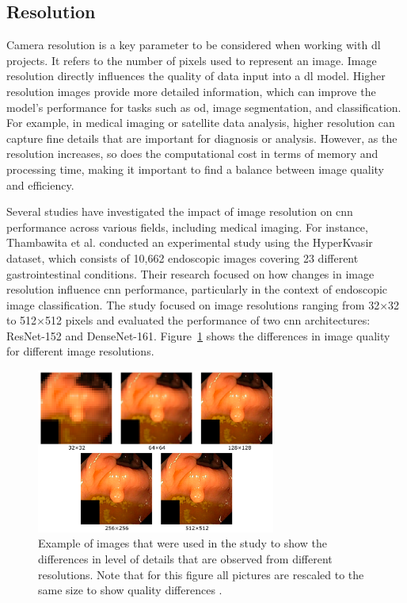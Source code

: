 \subsection{Resolution}
Camera resolution is a key parameter to be considered when working with \gls{dl} projects. It refers to the number of pixels used to represent an image. Image resolution directly influences the quality of data input into a \gls{dl} model. Higher resolution images provide more detailed information, which can improve the model's performance for tasks such as \gls{od}, image segmentation, and classification. For example, in medical imaging or satellite data analysis, higher resolution can capture fine details that are important for diagnosis or analysis. However, as the resolution increases, so does the computational cost in terms of memory and processing time, making it important to find a balance between image quality and efficiency.

Several studies have investigated the impact of image resolution on \gls{cnn} performance across various fields, including medical imaging. For instance, Thambawita et al. \cite{RES_IMP} conducted an experimental study using the HyperKvasir dataset, which consists of 10,662 endoscopic images covering 23 different gastrointestinal conditions. Their research focused on how changes in image resolution influence \gls{cnn} performance,  particularly in the context of endoscopic image classification. The study focused on image resolutions ranging from 32×32 to 512×512 pixels and evaluated the performance of two \gls{cnn} architectures: ResNet-152 and DenseNet-161. Figure~\ref{RES_COMP} shows the differences in image quality for different image resolutions. 
\begin{figure}[ht]
    \centering
    \includegraphics[width=0.7\textwidth]{Figures/RES_COMP.png}  
    \caption{Example of images that were used in the study to show the differences in level of details that are observed from different resolutions. Note that for this figure all pictures are rescaled to the same size to show quality differences \cite{RES_IMP}.}
    \label{RES_COMP}
\end{figure}

